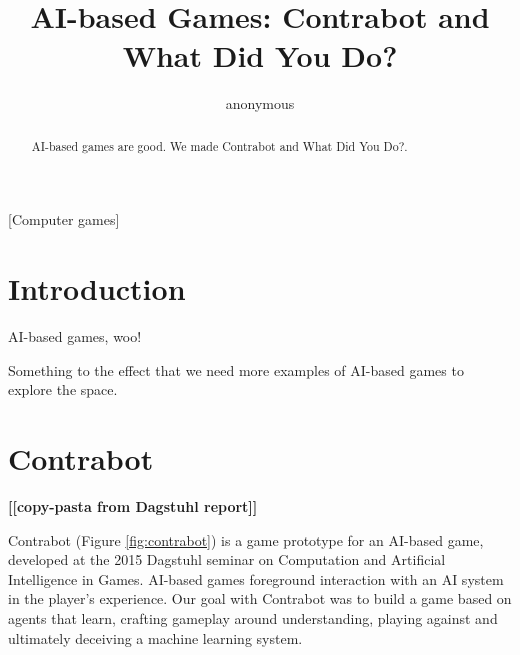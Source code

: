 \documentclass{sig-alternate}
\newcommand{\todo}[1]{\textbf{[[#1]]}}
\begin{document}

\title{AI-based Games: Contrabot and What Did You Do?}


\author{
\alignauthor
anonymous
}

\toappear{}

\maketitle
\begin{abstract}
AI-based games are good.
We made {\sc Contrabot} and {\sc What Did You Do?}.
\end{abstract}

[Computer games]




\section{Introduction}

\noindent AI-based games, woo!

Something to the effect that we need more examples of AI-based games to explore the space.

\section{{\sc Contrabot}}
\todo{copy-pasta from Dagstuhl report}

Contrabot (Figure \ref{fig:contrabot}) is a game prototype for an AI-based game, developed at the 2015 Dagstuhl seminar on Computation and Artificial Intelligence in Games.
AI-based games foreground interaction with an AI system in the player's experience.
Our goal with Contrabot was to build a game based on agents that learn, crafting gameplay around understanding, playing against and ultimately deceiving a machine learning system.
\end{document}
